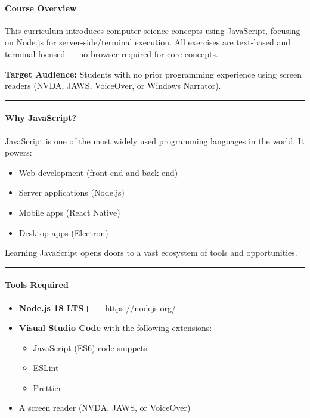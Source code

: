 \documentclass[
  justified,
  openright,
]{tufte-book}
\let\subsection\paragraph
\let\paragraph\paragraph
\let\subsection\paragraph
\let\paragraph\paragraph
\providecommand{\tightlist}{%
  \setlength{\itemsep}{0pt}\setlength{\parskip}{0pt}}
\begin{document}
\subsection{Course Overview}\label{course-overview}

This curriculum introduces computer science concepts using JavaScript,
focusing on Node.js for server-side/terminal execution. All exercises
are text-based and terminal-focused --- no browser required for core
concepts.

\textbf{Target Audience:} Students with no prior programming experience
using screen readers (NVDA, JAWS, VoiceOver, or Windows Narrator).

\begin{center}\rule{0.5\linewidth}{0.5pt}\end{center}

\subsection{Why JavaScript?}\label{why-javascript}

JavaScript is one of the most widely used programming languages in the
world. It powers:

\begin{itemize}
\tightlist
\item
  Web development (front-end and back-end)
\item
  Server applications (Node.js)
\item
  Mobile apps (React Native)
\item
  Desktop apps (Electron)
\end{itemize}

Learning JavaScript opens doors to a vast ecosystem of tools and
opportunities.

\begin{center}\rule{0.5\linewidth}{0.5pt}\end{center}

\subsection{Tools Required}\label{tools-required}

\begin{itemize}
\tightlist
\item
  \textbf{Node.js 18 LTS+} --- \url{https://nodejs.org/}
\item
  \textbf{Visual Studio Code} with the following extensions:

  \begin{itemize}
  \tightlist
  \item
    JavaScript (ES6) code snippets
  \item
    ESLint
  \item
    Prettier
  \end{itemize}
\item
  A screen reader (NVDA, JAWS, or VoiceOver)
\end{itemize}
\end{document}
